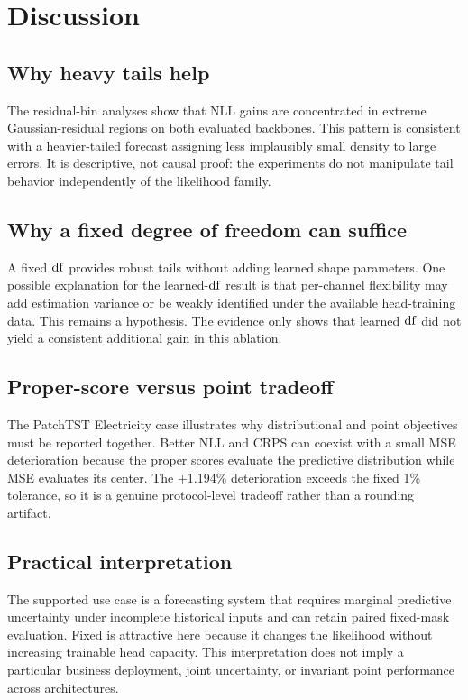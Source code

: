 \section{Discussion}
\label{sec:discussion}

\subsection{Why heavy tails help}
The residual-bin analyses show that NLL gains are concentrated in extreme Gaussian-residual regions on both evaluated backbones. This pattern is consistent with a heavier-tailed forecast assigning less implausibly small density to large errors. It is descriptive, not causal proof: the experiments do not manipulate tail behavior independently of the likelihood family.

\subsection{Why a fixed degree of freedom can suffice}
A fixed $\mathrm{df}$ provides robust tails without adding learned shape parameters. One possible explanation for the learned-$\mathrm{df}$ result is that per-channel flexibility may add estimation variance or be weakly identified under the available head-training data. This remains a hypothesis. The evidence only shows that learned $\mathrm{df}$ did not yield a consistent additional gain in this ablation.

\subsection{Proper-score versus point tradeoff}
The PatchTST Electricity case illustrates why distributional and point objectives must be reported together. Better NLL and CRPS can coexist with a small MSE deterioration because the proper scores evaluate the predictive distribution while MSE evaluates its center. The +1.194\% deterioration exceeds the fixed 1\% tolerance, so it is a genuine protocol-level tradeoff rather than a rounding artifact.

\subsection{Practical interpretation}
The supported use case is a forecasting system that requires marginal predictive uncertainty under incomplete historical inputs and can retain paired fixed-mask evaluation. Fixed \StudentT{} is attractive here because it changes the likelihood without increasing trainable head capacity. This interpretation does not imply a particular business deployment, joint uncertainty, or invariant point performance across architectures.
